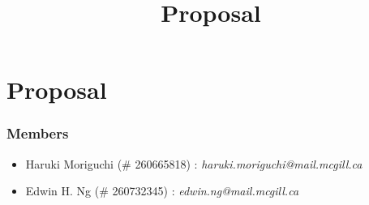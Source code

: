 \documentclass[12pt,a4paper]{report}
\begin{document}
\title{Proposal\\
}


\setcounter{page}{1}
\thispagestyle{empty} 


\chapter*{Proposal}
\subsection*{Members}
\begin{itemize}
\item Haruki Moriguchi (\# 260665818) : \textit{haruki.moriguchi@mail.mcgill.ca}
\item Edwin H. Ng (\# 260732345) : \textit{edwin.ng@mail.mcgill.ca}
\end{itemize}
\end{document}
